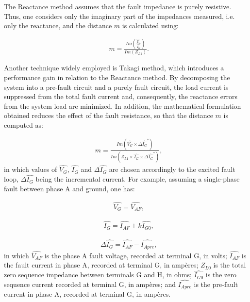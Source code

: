 \documentclass[conference]{IEEEtran}
\begin{document}
The Reactance method assumes that the fault impedance is purely resistive. Thus, one considers only the imaginary part of the impedances measured, i.e. only the reactance, and the distance $m$ is calculated using:

\begin{equation}\label{eq:mReac}
	\begin{aligned}
		&m=\frac{Im\left(\frac{\widehat{V_G}}{\widehat{I_G}}\right)}{Im(Z_{L1})}.
	\end{aligned}
\end{equation}

Another technique widely employed is Takagi method, which introduces a performance gain in relation to the Reactance method. By decomposing the system into a pre-fault circuit and a purely fault circuit, the load current is suppressed from the total fault current and, consequently, the reactance errors from the system load are minimized. In addition, the mathematical formulation obtained reduces the effect of the fault resistance, so that the distance $m$ is computed as:

\begin{equation}\label{eq:mTakagi}
	\begin{aligned}
		&m=\frac{Im(\widehat{V_G}\times\Delta\widehat{I_G}^*)}{Im(Z_{L1}\times\widehat{I_G}\times\Delta\widehat{I_G}^*)},
	\end{aligned}
\end{equation}
in which values of $\widehat{V_G}$, $\widehat{I_G}$ and $\Delta\widehat{I_G}$ are chosen accordingly to the excited fault loop, $\Delta\widehat{I_G}$ being the incremental current. For example, assuming a single-phase fault between phase A and ground, one has:

\begin{equation}
	\begin{aligned}
		&\widehat{V_G}=\widehat{V_{AF}},
	\end{aligned}
\end{equation}

\begin{equation}
	\begin{aligned}
		&\widehat{I_G}=\widehat{I_{AF}}+k\widehat{I_{G0}},
	\end{aligned}
\end{equation}	

\begin{equation}
	\begin{aligned}
		&\Delta\widehat{I_G}=\widehat{I_{AF}}-\widehat{I_{Apre}},
	\end{aligned}
\end{equation}
in which $\widehat{V_{AF}}$ is the phase A fault voltage, recorded at terminal G, in volts; $\widehat{I_{AF}}$ is the fault current in phase A, recorded at terminal G, in ampères; $Z_{L0}$ is the total zero sequence impedance between terminals G and H, in ohms; $\widehat{I_{G0}}$ is the zero sequence current recorded at terminal G, in ampères; and $\widehat{I_{Apre}}$ is the pre-fault current in phase A, recorded at terminal G, in ampères.
\end{document}
